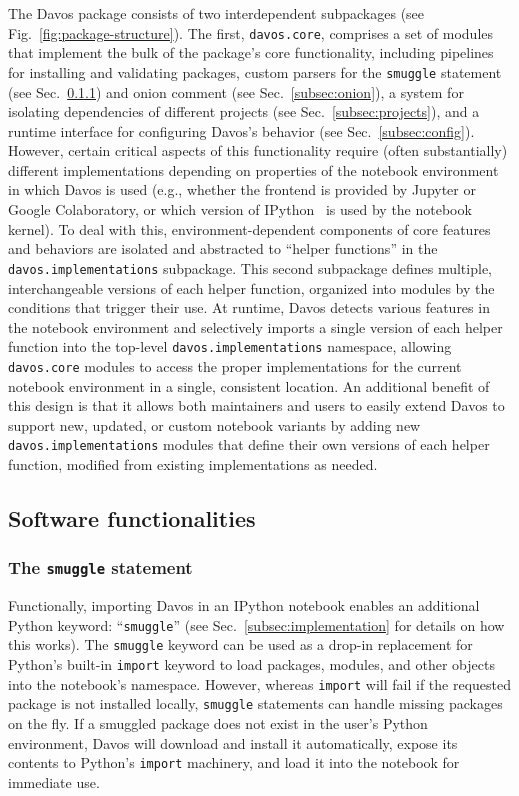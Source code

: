 \documentclass[preprint,12pt,a4paper]{elsarticle}
\begin{document}
The Davos package consists of two interdependent subpackages
(see Fig.~\ref{fig:package-structure}). The first,
\texttt{davos.core}, comprises a set of modules that
implement the bulk of the package's core
functionality, including pipelines for installing and validating
packages, custom parsers for the \texttt{smuggle} statement (see
Sec.~\ref{subsec:smuggle}) and onion comment (see
Sec.~\ref{subsec:onion}), a system for isolating dependencies of
different projects (see Sec.~\ref{subsec:projects}), and a runtime
interface for configuring Davos's behavior (see Sec.~\ref{subsec:config}).
However, certain critical aspects of this
functionality require (often substantially) different implementations
depending on properties of the notebook environment in which
Davos is used (e.g., whether the frontend is provided by
Jupyter or Google Colaboratory, or which version of
IPython~\cite{PereGran07} is used by the notebook kernel). To deal
with this, environment-dependent components of core features and behaviors
are isolated and abstracted to ``helper functions'' in the
\texttt{davos.implementations} subpackage. This second subpackage
defines multiple, interchangeable versions of each helper function,
organized into modules by the conditions that trigger their use. At
runtime, Davos detects various features in the notebook
environment and selectively imports a single version of each helper
function into the top-level \texttt{davos.implementations} namespace,
allowing \texttt{davos.core} modules to access the proper
implementations for the current notebook environment in a single,
consistent location. An additional benefit of this design is that it
allows both maintainers and users to easily extend Davos to
support new, updated, or custom notebook variants by adding new
\texttt{davos.implementations} modules that define their own versions
of each helper function, modified from existing implementations as
needed.


\subsection{Software functionalities}

\subsubsection{The \texttt{smuggle} statement}\label{subsec:smuggle}

Functionally, importing Davos in an IPython notebook enables
an additional Python keyword: ``\texttt{smuggle}'' (see
Sec.~\ref{subsec:implementation} for details on how this works).
The \texttt{smuggle} keyword can be used as a drop-in
replacement for Python's built-in \texttt{import} keyword to load
packages, modules, and other objects into the notebook's namespace.
However, whereas \texttt{import} will fail if the requested package is
not installed locally, \texttt{smuggle} statements can handle missing
packages on the fly.  If a smuggled package does not exist in the
user's Python environment, Davos will download and install it automatically,
expose its contents to Python's \texttt{import} machinery, and load it
into the notebook for immediate use.
\end{document}
